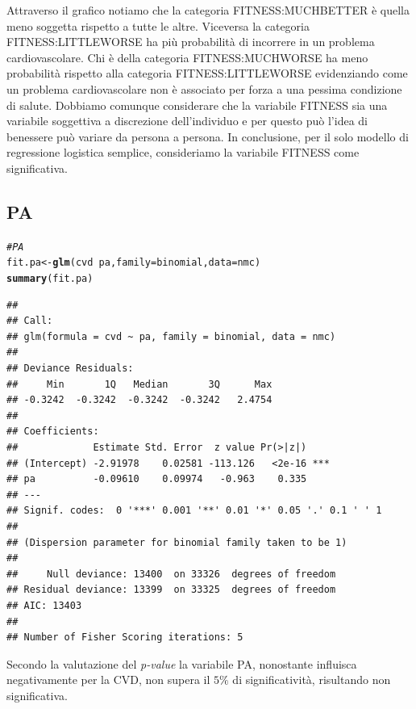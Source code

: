 \documentclass{article}\usepackage[]{graphicx}\usepackage[]{xcolor}
\makeatletter
\newcommand{\hlcom}[1]{\textcolor[rgb]{0.678,0.584,0.686}{\textit{#1}}}%
\newcommand{\hlopt}[1]{\textcolor[rgb]{0,0,0}{#1}}%
\newcommand{\hlstd}[1]{\textcolor[rgb]{0.345,0.345,0.345}{#1}}%
\newcommand{\hlkwb}[1]{\textcolor[rgb]{0.69,0.353,0.396}{#1}}%
\newcommand{\hlkwc}[1]{\textcolor[rgb]{0.333,0.667,0.333}{#1}}%
\newcommand{\hlkwd}[1]{\textcolor[rgb]{0.737,0.353,0.396}{\textbf{#1}}}%
\newenvironment{kframe}{%
 \def\at@end@of@kframe{}%
 \ifinner\ifhmode%
  \def\at@end@of@kframe{\end{minipage}}%
  \begin{minipage}{\columnwidth}%
 \fi\fi%
 \def\FrameCommand##1{\hskip\@totalleftmargin \hskip-\fboxsep
 \colorbox{shadecolor}{##1}\hskip-\fboxsep
     \hskip-\linewidth \hskip-\@totalleftmargin \hskip\columnwidth}%
 \MakeFramed {\advance\hsize-\width
   \@totalleftmargin\z@ \linewidth\hsize
   \@setminipage}}%
 {\par\unskip\endMakeFramed%
 \at@end@of@kframe}
\newenvironment{knitrout}{}{} %
\makeatother
\begin{document}
    Attraverso il grafico notiamo che la categoria FITNESS:MUCHBETTER è quella meno
    soggetta rispetto a tutte le altre. Viceversa la categoria FITNESS:LITTLEWORSE 
    ha più probabilità di incorrere in un problema cardiovascolare.
    Chi è della categoria FITNESS:MUCHWORSE ha meno probabilità rispetto alla 
    categoria FITNESS:LITTLEWORSE evidenziando come un problema cardiovascolare
    non è associato per forza a una pessima condizione di salute.
    Dobbiamo comunque considerare che la variabile FITNESS sia una variabile
    soggettiva a discrezione dell'individuo e per questo può l'idea di
    benessere può variare da persona a persona.
    In conclusione, per il solo modello di regressione logistica semplice,
    consideriamo la variabile FITNESS come significativa.
    
  \clearpage

  \subsection{PA}
\begin{knitrout}
\color{fgcolor}\begin{kframe}
\begin{alltt}
\hlcom{#PA}
\hlstd{fit.pa} \hlkwb{<-} \hlkwd{glm}\hlstd{(cvd}\hlopt{~}\hlstd{pa,} \hlkwc{family}\hlstd{=binomial,} \hlkwc{data}\hlstd{=nmc)}
\hlkwd{summary}\hlstd{(fit.pa)}
\end{alltt}
\begin{verbatim}
## 
## Call:
## glm(formula = cvd ~ pa, family = binomial, data = nmc)
## 
## Deviance Residuals: 
##     Min       1Q   Median       3Q      Max  
## -0.3242  -0.3242  -0.3242  -0.3242   2.4754  
## 
## Coefficients:
##             Estimate Std. Error  z value Pr(>|z|)    
## (Intercept) -2.91978    0.02581 -113.126   <2e-16 ***
## pa          -0.09610    0.09974   -0.963    0.335    
## ---
## Signif. codes:  0 '***' 0.001 '**' 0.01 '*' 0.05 '.' 0.1 ' ' 1
## 
## (Dispersion parameter for binomial family taken to be 1)
## 
##     Null deviance: 13400  on 33326  degrees of freedom
## Residual deviance: 13399  on 33325  degrees of freedom
## AIC: 13403
## 
## Number of Fisher Scoring iterations: 5
\end{verbatim}
\end{kframe}
\end{knitrout}
    
    Secondo la valutazione del \emph{p-value} la variabile PA, nonostante 
    influisca negativamente per la CVD, non supera il $5\%$ di significatività, 
    risultando non significativa.
    
\end{document}

